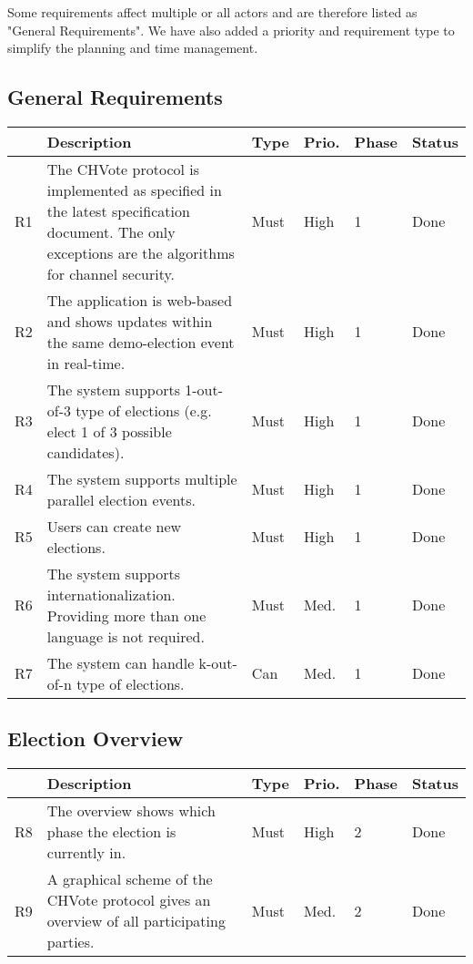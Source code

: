Some requirements affect multiple or all actors and are therefore listed as "{}General Requirements"{}. We have also added a priority and requirement type to simplify the planning and time management.
\subsection{General Requirements}
\begin{longtable}{p{0.5cm}p{9cm}p{1cm}p{1cm}p{1cm}p{1cm}}
\hline
 & Description & Type & Prio. & Phase & Status\\
\hline
R1 & The CHVote protocol is implemented as specified in the latest specification document. The only exceptions are the algorithms for channel security. & Must & High & 1 & Done\\
R2 & The application is web-based and shows updates within the same demo-election event in real-time. & Must & High & 1 & Done\\
R3 & The system supports 1-out-of-3 type of elections (e.g. elect 1 of 3 possible candidates). & Must & High & 1 & Done\\
R4 & The system supports multiple parallel election events. & Must & High & 1 &  Done\\
R5 & Users can create new elections. & Must & High & 1 & Done \\
R6 & The system supports internationalization. Providing more than one language is not required. & Must & Med. & 1 & Done\\
R7 & The system can handle k-out-of-n type of elections. & Can & Med. & 1 & Done\\
\end{longtable}


\subsection{Election Overview}
\begin{longtable}{p{0.5cm}p{9cm}p{1cm}p{1cm}p{1cm}p{1cm}}
\hline
 & Description & Type & Prio. & Phase & Status\\
\hline
R8 & The overview shows which phase the election is currently in. & Must & High & 2 & Done\\
R9 & A graphical scheme of the CHVote protocol gives an overview of all participating parties. & Must & Med. & 2 & Done\\
\end{longtable}

